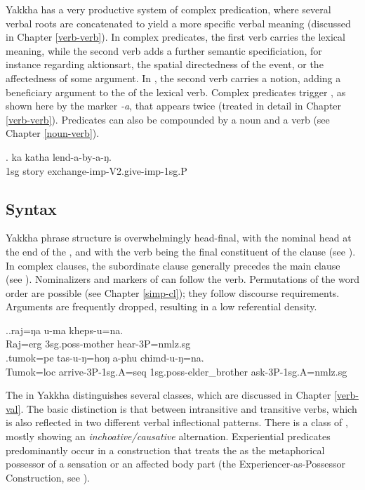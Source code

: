 Yakkha has a very productive system of complex predication, where several verbal roots are concatenated to yield a more specific verbal meaning (discussed in Chapter \ref{verb-verb}). In complex predicates, the first verb carries the lexical meaning, while the second verb adds a further semantic specificiation, for instance regarding aktionsart, the spatial directedness of the event, or the affectedness of some argument. In \Next, the second verb carries a  notion, adding a beneficiary argument to the  of the lexical verb. Complex predicates trigger , as shown here by the  marker \emph{-a}, that appears twice (treated in detail in Chapter \ref{verb-verb}). Predicates can also be compounded by a noun and a verb  (see Chapter \ref{noun-verb}).
 	
	\exg. ka katha lend-a-by-a-ŋ.\\
	{\sc 1sg} story  exchange{\sc -imp-V2.give-imp-1sg.P}\\



\subsection{Syntax}

Yakkha phrase structure is overwhelmingly  head-final, with the nominal head at the end of the , and with the verb being the final constituent of the clause (see \Next[a]). In complex clauses, the subordinate clause generally precedes the main clause (see \Next[b]). Nominalizers and markers of  can follow the verb. Permutations of the word order are possible (see Chapter \ref{simp-cl}); they follow discourse requirements. Arguments are frequently dropped, resulting in a low referential density. 

\ex.\ag.raj=ŋa u-ma  kheps-u=na.\\
Raj{\sc =erg} {\sc 3sg.poss-}mother hear{\sc [pst]-3P=nmlz.sg}\\
\bg.tumok=pe tas-u-ŋ=hoŋ a-phu chimd-u-ŋ=na.\\
Tumok{\sc =loc} arrive{\sc [pst]-3P-1sg.A=seq} {\sc 1sg.poss-}elder\_brother ask{\sc [pst]-3P-1sg.A=nmlz.sg}\\

The  in Yakkha distinguishes several  classes, which are discussed in Chapter \ref{verb-val}. The basic distinction is that between intransitive and transitive verbs, which is also reflected in two different verbal inflectional patterns. There is a class of , mostly showing an \emph{inchoative/causative} alternation. Experiential predicates predominantly occur in a construction that treats the  as the metaphorical possessor of a sensation or an affected body part (the Experiencer-as-Possessor Construction, see \Next).

